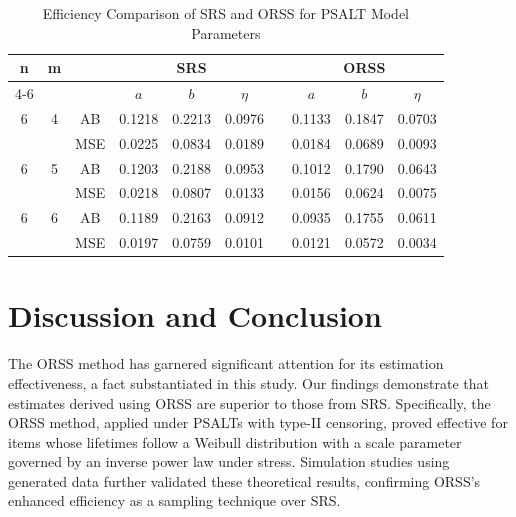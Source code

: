 \documentclass[twoside]{article}
\begin{document}
\begin{table}[h]
\begin{center}
\small
\caption{Efficiency Comparison of SRS and ORSS for PSALT Model Parameters}\label{tab2}
\begin{tabular}{cccccccccc}
  \hline
  n  & m &  & \multicolumn{3}{c}{SRS} & & \multicolumn{3}{c}{ORSS} 
 \\
\cline{4-6} \cline{8-10}
 &  &  & $a$ & $b$ & $\eta$ & & $a$ & $b$ & $\eta$
\\
 \hline
 6 & 4 & AB &  0.1218 & 0.2213 & 0.0976 && 0.1133 & 0.1847 & 0.0703
 \\
    &  & MSE & 0.0225 & 0.0834 & 0.0189 &&  0.0184 & 0.0689 & 0.0093
    \\
 \hline
 6 & 5 & AB & 0.1203 & 0.2188 & 0.0953 && 0.1012 & 0.1790 & 0.0643
 \\
    &  & MSE & 0.0218 & 0.0807 & 0.0133 && 0.0156 & 0.0624 & 0.0075
    \\
 \hline
 6 & 6 & AB & 0.1189 & 0.2163 & 0.0912 && 0.0935 & 0.1755 & 0.0611
 \\
    &  & MSE & 0.0197 & 0.0759 & 0.0101 && 0.0121 & 0.0572 & 0.0034
\\
 \hline
\end{tabular}
\end{center}
\end{table}




\section*{Discussion and Conclusion}   
The ORSS method has garnered significant attention for its estimation effectiveness, a fact substantiated in this study. Our findings demonstrate that estimates derived using ORSS are superior to those from SRS. Specifically, the ORSS method, applied under PSALTs with type-II censoring, proved effective for items whose lifetimes follow a Weibull distribution with a scale parameter governed by an inverse power law under stress. Simulation studies using generated data further validated these theoretical results, confirming ORSS’s enhanced efficiency as a sampling technique over SRS.

\end{document}
